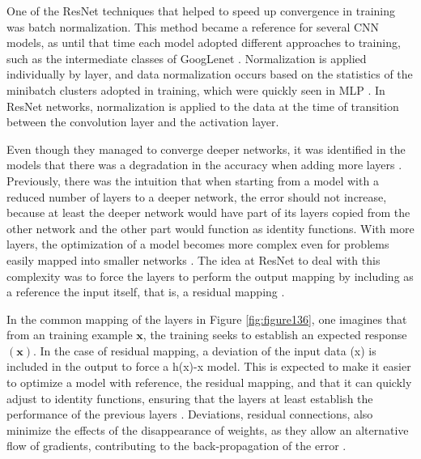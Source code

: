 One of the ResNet techniques that helped to speed up convergence in training was batch normalization. This method became a reference for several CNN models, as until that time each model adopted different approaches to training, such as the intermediate classes of GoogLenet \cite{johnson2019}. Normalization is applied individually by layer, and data normalization occurs based on the statistics of the minibatch clusters adopted in training, which were quickly seen in MLP \cite{zhang2020dive}. In ResNet networks, normalization is applied to the data at the time of transition between the convolution layer and the activation layer.

Even though they managed to converge deeper networks, it was identified in the models that there was a degradation in the accuracy when adding more layers \cite{he2016}. Previously, there was the intuition that when starting from a model with a reduced number of layers to a deeper network, the error should not increase, because at least the deeper network would have part of its layers copied from the other network and the other part would function as identity functions. With more layers, the optimization of a model becomes more complex even for problems easily mapped into smaller networks \cite{he2016}. The idea at ResNet to deal with this complexity was to force the layers to perform the output mapping by including as a reference the input itself, that is, a residual mapping \cite{geron2019}.

In the common mapping of the layers in Figure \ref{fig:figure136}, one imagines that from an training example $\mathbf{x}$, the training seeks to establish an expected response $\mathbf{(x)}$. In the case of residual mapping, a deviation of the input data (x) is included in the output to force a h(x)-x model. This is expected to make it easier to optimize a model with reference, the residual mapping, and that it can quickly adjust to identity functions, ensuring that the layers at least establish the performance of the previous layers \cite{zhang2020dive}. Deviations, residual connections, also minimize the effects of the disappearance of weights, as they allow an alternative flow of gradients, contributing to the back-propagation of the error \cite{elgendy2020}.

